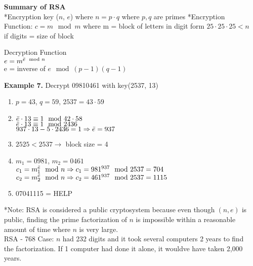 \documentclass [12pt]{article}
\begin{document}
\noindent\textbf{Summary of RSA}\\
*Encryption key ($n$, $e$) where $n = p\cdot q$ where $p,q$ are primes
*Encryption Function: $c=m \mod m$ where m = block of letters in digit form $25\cdot25\cdot25<n$ if digits = size of block\\
\vspace{0.1cm}

\noindent*Decryption Function \\
\quad $e=m^{\Bar{e}\mod n}$\\
\quad e = inverse of $e\mod(p-1)(q-1)$\\
\vspace{0.2in}

\noindent\textbf{Example 7.} Decrypt 09810461 with key(2537, 13)
\begin{enumerate}[\quad1.]
    \item $p=43$, $q=59$, $2537=43\cdot59$
    \item $\Bar{e}\cdot13\equiv1\mod42\cdot58$\\
    \quad $\Bar{e}\cdot13\equiv1\mod2436$\\
    \quad $937\cdot13-5\cdot2436=1\Rightarrow\Bar{e}=937$
    \item $2525 < 2537\rightarrow$ block size = 4
    \item $m_1 = 0981$, $m_2=0461$\\
    \quad $c_1=m_1^{\Bar{e}}\mod n\Rightarrow c_1 = 981^{937}\mod2537=704$\\
    \quad $c_2=m_2^{\Bar{e}}\mod n\Rightarrow c_2=461^{937}\mod2537=1115$
    \item 07041115 = HELP
\end{enumerate}
*Note: RSA is considered a public cryptosystem because even though $(n,e)$ is public, finding the prime factorization of $n$ is impossible within a reasonable amount of time where $n$ is very large.\\
RSA - 768 Case: $n$ had 232 digits and it took several computers 2 years to find the factorization. If 1 computer had done it alone, it wouldve have taken 2,000 years.
\end{document}
